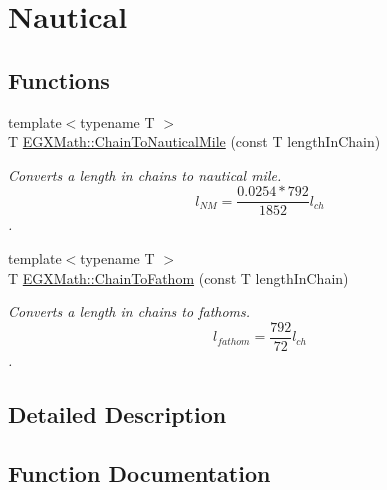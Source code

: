 \hypertarget{group___e_g_x_math-_conversions-_length_conversions-_surveyors-_chain-_nautical}{}\section{Nautical}
\label{group___e_g_x_math-_conversions-_length_conversions-_surveyors-_chain-_nautical}
\subsection*{Functions}
\begin{DoxyCompactItemize}
\item 
{\footnotesize template$<$typename T $>$ }\\T \mbox{\hyperlink{group___e_g_x_math-_conversions-_length_conversions-_surveyors-_chain-_nautical_gad4c03e3aae08135e79dd4b6becc65d47}{E\+G\+X\+Math\+::\+Chain\+To\+Nautical\+Mile}} (const T length\+In\+Chain)
\begin{DoxyCompactList}\small\item\em Converts a length in chains to nautical mile. \[ l_{NM}= \frac{0.0254 * 792}{1852} l_{ch} \]. \end{DoxyCompactList}\item 
{\footnotesize template$<$typename T $>$ }\\T \mbox{\hyperlink{group___e_g_x_math-_conversions-_length_conversions-_surveyors-_chain-_nautical_ga39e7643cd4567eba7c466c440e7992d6}{E\+G\+X\+Math\+::\+Chain\+To\+Fathom}} (const T length\+In\+Chain)
\begin{DoxyCompactList}\small\item\em Converts a length in chains to fathoms. \[ l_{fathom}= \frac{792}{72} l_{ch} \]. \end{DoxyCompactList}\end{DoxyCompactItemize}


\subsection{Detailed Description}


\subsection{Function Documentation}
\mbox{\label{group___e_g_x_math-_conversions-_length_conversions-_surveyors-_chain-_nautical_ga39e7643cd4567eba7c466c440e7992d6}} 
